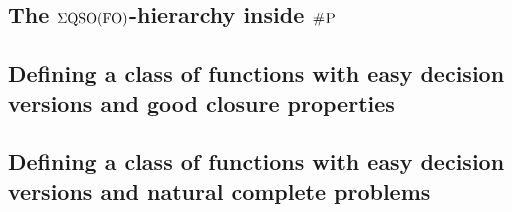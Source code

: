


%
%
%
%
%

\subsection{The $\Sigma{\rm QSO}({\rm FO})$-hierarchy inside $\text{\sc \#P}$}
\label{sec-hier-shp}


\subsection{Defining a class of functions with easy decision versions and good closure properties}
\label{sec-clo}


\subsection{Defining a class of functions with easy decision versions and natural complete problems}
\label{sec-horn}



